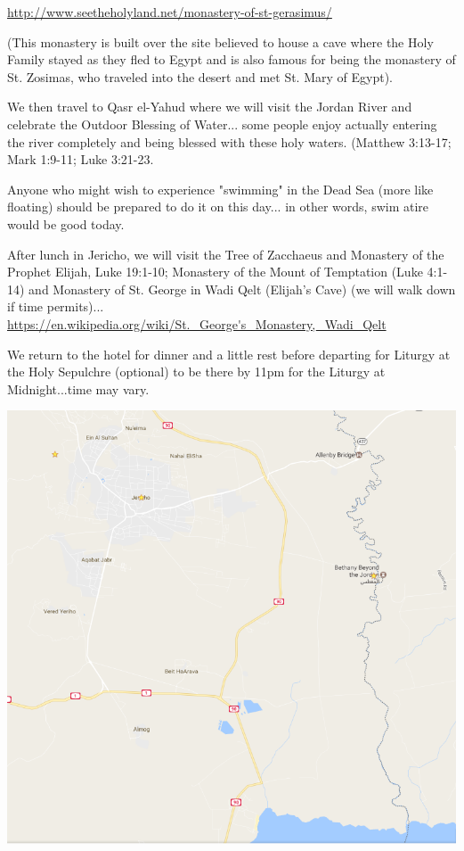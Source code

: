 \documentclass[letterpaper]{report}
\begin{document}
\url{http://www.seetheholyland.net/monastery-of-st-gerasimus/}

(This monastery is built over the site believed to house a cave where the Holy 
Family stayed as they fled to Egypt and is also famous for being the monastery 
of St. Zosimas, who traveled into the desert and met St. Mary of Egypt).

We then travel to Qasr el-Yahud where we will visit the Jordan River and 
celebrate the Outdoor Blessing of Water...
some people enjoy actually entering the river completely and being blessed
with these holy waters.
(Matthew 3:13-17; Mark 1:9-11; Luke 3:21-23.

Anyone who might wish to experience "swimming" in the Dead Sea
(more like floating) should be prepared to do it on this day...
in other words, swim atire would be good today.

After lunch in Jericho,
we will visit the Tree of Zacchaeus and Monastery of the Prophet Elijah,
Luke 19:1-10;
Monastery of the Mount of Temptation (Luke 4:1-14)
and Monastery of St. George in Wadi Qelt (Elijah's Cave)
(we will walk down if time permits)...
\url{https://en.wikipedia.org/wiki/St._George's_Monastery,_Wadi_Qelt}

We return to the hotel for dinner and a little rest before departing for 
Liturgy at the Holy Sepulchre (optional)
to be there by 11pm for the Liturgy at Midnight...time may vary.

\includegraphics[width=\textwidth]{JordanDeadseaJerichoTemptation}
\end{document}
